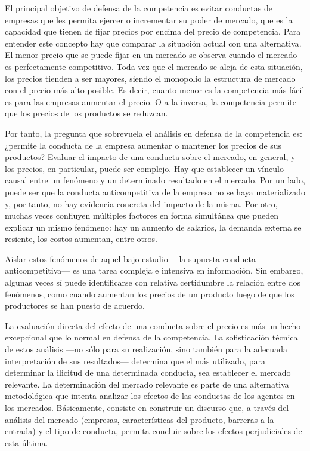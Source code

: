\documentclass[
  12pt,
  spanish,
]{book}
\begin{document}
El principal objetivo de defensa de la competencia es evitar conductas de empresas que les permita ejercer o incrementar su poder de mercado, que es la capacidad que tienen de fijar precios por encima del precio de competencia. Para entender este concepto hay que comparar la situación actual con una alternativa. El menor precio que se puede fijar en un mercado se observa cuando el mercado es perfectamente competitivo. Toda vez que el mercado se aleja de esta situación, los precios tienden a ser mayores, siendo el monopolio la estructura de mercado con el precio más alto posible. Es decir, cuanto menor es la competencia más fácil es para las empresas aumentar el precio. O a la inversa, la competencia permite que los precios de los productos se reduzcan.

Por tanto, la pregunta que sobrevuela el análisis en defensa de la competencia es: ¿permite la conducta de la empresa aumentar o mantener los precios de sus productos? Evaluar el impacto de una conducta sobre el mercado, en general, y los precios, en particular, puede ser complejo. Hay que establecer un vínculo causal entre un fenómeno y un determinado resultado en el mercado. Por un lado, puede ser que la conducta anticompetitiva de la empresa no se haya materializado y, por tanto, no hay evidencia concreta del impacto de la misma. Por otro, muchas veces confluyen múltiples factores en forma simultánea que pueden explicar un mismo fenómeno: hay un aumento de salarios, la demanda externa se resiente, los costos aumentan, entre otros.

Aislar estos fenómenos de aquel bajo estudio ---la supuesta conducta anticompetitiva--- es una tarea compleja e intensiva en información. Sin embargo, algunas veces sí puede identificarse con relativa certidumbre la relación entre dos fenómenos, como cuando aumentan los precios de un producto luego de que los productores se han puesto de acuerdo.

La evaluación directa del efecto de una conducta sobre el precio es más un hecho excepcional que lo normal en defensa de la competencia. La sofisticación técnica de estos análisis ---no sólo para su realización, sino también para la adecuada interpretación de sus resultados--- determina que el más utilizado, para determinar la ilicitud de una determinada conducta, sea establecer el mercado relevante. La determinación del mercado relevante es parte de una alternativa metodológica que intenta analizar los efectos de las conductas de los agentes en los mercados. Básicamente, consiste en construir un discurso que, a través del análisis del mercado (empresas, características del producto, barreras a la entrada) y el tipo de conducta, permita concluir sobre los efectos perjudiciales de esta última.
\end{document}
